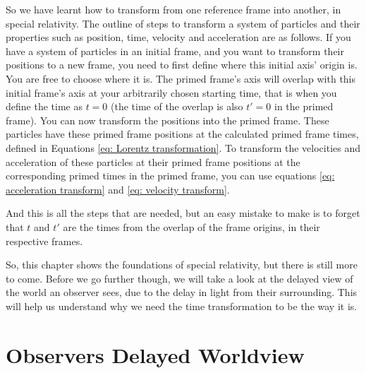 So we have learnt how to transform from one reference frame into another, in special relativity.
The outline of steps to transform a system of particles and their properties such as position, time, velocity and acceleration are as follows.
If you have a system of particles in an initial frame, and you want to transform their positions to a new frame, you need to first define where this initial axis' origin is.
You are free to choose where it is.
The primed frame's axis will overlap with this initial frame's axis at your arbitrarily chosen starting time, that is when you define the time as ${t}=0$ (the time of the overlap is also ${t{'}}=0$ in the primed frame).
You can now transform the positions into the primed frame.
These particles have these primed frame positions at the calculated primed frame times, defined in Equations \eqref{eq: Lorentz transformation}.
To transform the velocities and acceleration of these particles at their primed frame positions at the corresponding primed times in the primed frame, you can use equations \eqref{eq: acceleration transform} and \eqref{eq: velocity transform}.

And this is all the steps that are needed, but an easy mistake to make is to forget that ${t}$ and ${t{'}}$ are the times from the overlap of the frame origins, in their respective frames.

So, this chapter shows the foundations of special relativity, but there is still more to come.
Before we go further though, we will take a look at the delayed view of the world an observer sees, due to the delay in light from their surrounding.
This will help us understand why we need the time transformation to be the way it is.



\printbibliography[segment=\therefsegment, heading=subbibliography]

\chapter{Observers Delayed Worldview} \label{ch: Observers Delayed Worldview}

